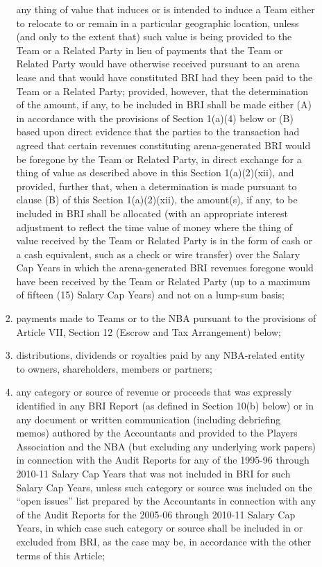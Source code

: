 \documentclass[
]{book}
\begin{document}
\begin{enumerate}
\begin{enumerate}
\begin{enumerate}
      any thing of value that induces or is intended to induce a Team either to relocate to or remain in a particular geographic location, unless (and only to the extent that) such value is being provided to the Team or a Related Party in lieu of payments that the Team or Related Party would have otherwise received pursuant to an arena lease and that would have constituted BRI had they been paid to the Team or a Related Party; provided, however, that the determination of the amount, if any, to be included in BRI shall be made either (A) in accordance with the provisions of Section 1(a)(4) below or (B) based upon direct evidence that the parties to the transaction had agreed that certain revenues constituting arena-generated BRI would be foregone by the Team or Related Party, in direct exchange for a thing of value as described above in this Section 1(a)(2)(xii), and provided, further that, when a determination is made pursuant to clause (B) of this Section 1(a)(2)(xii), the amount(s), if any, to be included in BRI shall be allocated (with an appropriate interest adjustment to reflect the time value of money where the thing of value received by the Team or Related Party is in the form of cash or a cash equivalent, such as a check or wire transfer) over the Salary Cap Years in which the arena-generated BRI revenues foregone would have been received by the Team or Related Party (up to a maximum of fifteen (15) Salary Cap Years) and not on a lump-sum basis;
    \item
      payments made to Teams or to the NBA pursuant to the provisions of Article VII, Section 12 (Escrow and Tax Arrangement) below;
    \item
      distributions, dividends or royalties paid by any NBA-related entity to owners, shareholders, members or partners;
    \item
      any category or source of revenue or proceeds that was expressly identified in any BRI Report (as defined in Section 10(b) below) or in any document or written communication (including debriefing memos) authored by the Accountants and provided to the Players Association and the NBA (but excluding any underlying work papers) in connection with the Audit Reports for any of the 1995-96 through 2010-11 Salary Cap Years that was not included in BRI for such Salary Cap Years, unless such category or source was included on the ``open issues'' list prepared by the Accountants in connection with any of the Audit Reports for the 2005-06 through 2010-11 Salary Cap Years, in which case such category or source shall be included in or excluded from BRI, as the case may be, in accordance with the other terms of this Article;

\end{enumerate}
\end{enumerate}
\end{enumerate}
\end{document}
